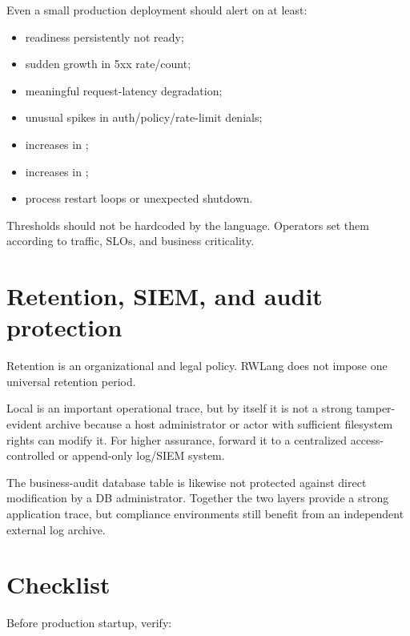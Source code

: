 Even a small production deployment should alert on at least:

\begin{itemize}
  \item readiness persistently not ready;
  \item sudden growth in 5xx rate/count;
  \item meaningful request-latency degradation;
  \item unusual spikes in auth/policy/rate-limit denials;
  \item increases in ;
  \item increases in ;
  \item process restart loops or unexpected shutdown.
\end{itemize}

Thresholds should not be hardcoded by the language. Operators set them according to traffic, SLOs, and business criticality.

\section{Retention, SIEM, and audit protection}

Retention is an organizational and legal policy. RWLang does not impose one universal retention period.

Local  is an important operational trace, but by itself it is not a strong tamper-evident archive because a host administrator or actor with sufficient filesystem rights can modify it. For higher assurance, forward it to a centralized access-controlled or append-only log/SIEM system.

The business-audit database table is likewise not protected against direct modification by a DB administrator. Together the two layers provide a strong application trace, but compliance environments still benefit from an independent external log archive.

\section{Checklist}

Before production startup, verify:

